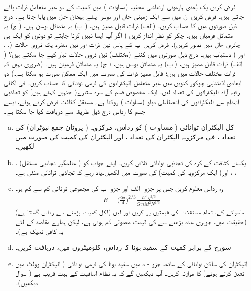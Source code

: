 فرض کریں یک بُعدی ہارمونی ارتعاشی مخفیہ (مساوات ) میں کمیت  کے دو غیر متعامل ذرات پائے جاتے ہیں۔ فرض کریں ان میں سے ایک زمینی حال اور دوسرا پہلے ہیجان حال میں پایا جاتا ہے۔ درج ذیل صورتوں میں  کا حساب کریں۔ (الف) ذرات قابل ممیز ہیں، ( ب) یہ متماثل بوسن ہیں، ( ج) یہ متماثل فرمیان ہیں۔ چکر کو نظر انداز کریں ( اگر آپ ایسا نہیں کرنا چاہتے تو دونوں کو ایک ہی چکری حال میں تصور کریں)۔ 
فرض کریں آپ کے پاس تین ذرات اور تین منفرد یک ذروی حالات (، ، اور ) دستیاب ہیں۔ درج ذیل صورتوں میں کتنے (مختلف) تین ذروی حالات تیار کیے جا سکتے ہیں؟ ( الف) ذرات قابل ممیز ہیں، ( ب) یہ متماثل بوسن ہیں، ( ج) یہ متماثل فرمیان ہیں۔ (ضروری نہیں کہ ذرات مختلف حالات میں ہوں؛ قابل ممیز ذرات کی صورت میں  ایک ممکن صورت ہو سکتا ہے۔)
دو ابعادی لامتناہی چوکور کنویں میں غیر متعامل الیکٹرانوں کی فرمی توانائی کا حساب کریں۔ فی اکائی رقبہ آزاد الیکٹرانوں کی تعداد  لیں۔
ایک مخصوص قسم کے سرد ستارے( جنہیں  کہتے ہیں) کو تجاذبی انہدام سے الیکٹرانوں کی انحطاطی دباو (مساوات ) روکتا ہے۔ مستقل کثافت فرض کرتے ہوئے، ایسے جسم کا رداس  درج ذیل طریقہ سے دریافت کیا جا سکتا ہے۔
\begin{enumerate}[a.]
\item
کل الیکٹران توانائی ( مساوات ) کو رداس، مرکزویہ ( پروٹان جمع نیوٹران) کی تعداد ، فی مرکزویہ الیکٹران کی تعداد ، اور الیکٹران کی کمیت  کی صورت میں لکھیں۔ 
\item
 یکساں کثافت کے کرہ کی تجاذبی توانائی تلاش کریں۔ اپنے جواب کو ( عالمگیر تجاذبی مستقل) ، ، ، اور( ایک مرکزویہ کی کمیت)  کی صورت میں لکھیں۔یاد رہے کہ تجاذبی توانائی منفی ہے۔
\item
وہ رداس معلوم کریں جس پر جزو- الف اور جزو- ب کی مجموعی توانائی کم سے کم ہو۔ 
\begin{align*}
R = \big ( \frac{9 \pi}{4} \big )^{2/3} \frac{\hslash^2 q^{5/3}}{GmM^2 N^{1/3}}
\end{align*}
(کل کمیت بڑھنے سے رداس گھٹتا ہے!) ماسوائے  کے، تمام مستقلات کی قیمتیں پر کریں اور  لیں (حقیقت میں، جوہری عدد بڑھنے سے  کی قیمت معمولی کم ہوتی ہے، لیکن ہمارے مقاصد کے لئے یہ کافی ٹھیک ہے)۔  
 \item 
 سورج کے برابر کمیت کے سفید بونا کا رداس، کلومیٹروں میں، دریافت کریں۔ 
\item
الیکٹران کی ساکن توانائی کے ساتھ، جزو - د میں سفید بونا کی فرمی توانائی ( الیکٹران وولٹ میں تعین کرتے ہوئے) کا موازنہ کریں۔ آپ دیکھیں گے کہ یہ نظام اضافیت کے بہت قریب ہے ( سوال  دیکھیں)۔
\end{enumerate}
